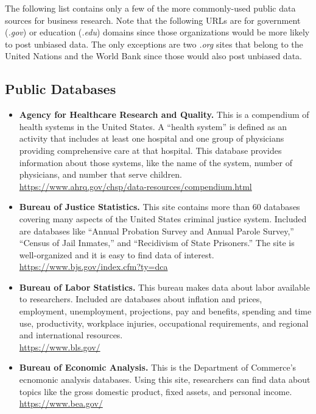 The following list contains only a few of the more commonly-used public data sources for business research. Note that the following URLs are for government (\textit{.gov}) or education (\textit{.edu}) domains since those organizations would be more likely to post unbiased data. The only exceptions are two \textit{.org} sites that belong to the United Nations and the World Bank since those would also post unbiased data.

\subsection{Public Databases}

\begin{itemize}
	
	\item \textbf{Agency for Healthcare Research and Quality.} This is a compendium of health systems in the United States. A ``health system'' is defined as an activity that includes at least one hospital and one group of physicians providing comprehensive care at that hospital. This database provides information about those systems, like the name of the system, number of physicians, and number that serve children. 
	\\ \url{https://www.ahrq.gov/chsp/data-resources/compendium.html}

	\item \textbf{Bureau of Justice Statistics.} This site contains more than 60 databases covering many aspects of the United States criminal justice system. Included are databases like ``Annual Probation Survey and Annual Parole Survey,'' ``Census of Jail Inmates,'' and ``Recidivism of State Prisoners.'' The site is well-organized and it is easy to find data of interest.
	\\ \url{https://www.bjs.gov/index.cfm?ty=dca}

	\item \textbf{Bureau of Labor Statistics.} This bureau makes data about labor available to researchers. Included are databases about inflation and prices, employment, unemployment, projections, pay and benefits, spending and time use, productivity, workplace injuries, occupational requirements, and regional and international resources.
	\\ \url{https://www.bls.gov/}

	\item \textbf{Bureau of Economic Analysis.} This is the Department of Commerce's ecnomonic analysis databases. Using this site, researchers can find data about topics like the gross domestic product, fixed assets, and personal income.
	\\ \url{https://www.bea.gov/}


\end{itemize}
